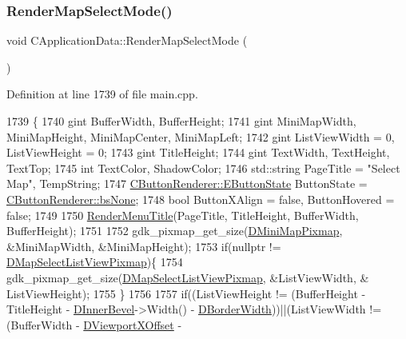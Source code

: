\subsubsection{\texorpdfstring{Render\+Map\+Select\+Mode()}{RenderMapSelectMode()}}
{\footnotesize\ttfamily void C\+Application\+Data\+::\+Render\+Map\+Select\+Mode (\begin{DoxyParamCaption}{ }\end{DoxyParamCaption})\hspace{0.3cm}{\ttfamily [protected]}}



Definition at line 1739 of file main.\+cpp.


\begin{DoxyCode}
1739                                           \{
1740     gint BufferWidth, BufferHeight;
1741     gint MiniMapWidth, MiniMapHeight, MiniMapCenter, MiniMapLeft;
1742     gint ListViewWidth = 0, ListViewHeight = 0;
1743     gint TitleHeight;
1744     gint TextWidth, TextHeight, TextTop;
1745     \textcolor{keywordtype}{int} TextColor, ShadowColor;
1746     std::string PageTitle = \textcolor{stringliteral}{"Select Map"}, TempString;
1747     \hyperlink{classCButtonRenderer_ae0eccda184600f6e14bfd59033e5e9a1}{CButtonRenderer::EButtonState} ButtonState = 
      \hyperlink{classCButtonRenderer_ae0eccda184600f6e14bfd59033e5e9a1aa0cd7277705307bef6c50f2250b5d62d}{CButtonRenderer::bsNone};
1748     \textcolor{keywordtype}{bool} ButtonXAlign = \textcolor{keyword}{false}, ButtonHovered = \textcolor{keyword}{false};
1749     
1750     \hyperlink{classCApplicationData_a548c5924a281c7e226fd7cac44e59920}{RenderMenuTitle}(PageTitle, TitleHeight, BufferWidth, BufferHeight); 
1751 
1752     gdk\_pixmap\_get\_size(\hyperlink{classCApplicationData_abe3af81659ead5113b7b2f165a88e737}{DMiniMapPixmap}, &MiniMapWidth, &MiniMapHeight); 
1753     \textcolor{keywordflow}{if}(\textcolor{keyword}{nullptr} != \hyperlink{classCApplicationData_a76e4af228d69ca3c6b1cf0770ca2e7a0}{DMapSelectListViewPixmap})\{
1754         gdk\_pixmap\_get\_size(\hyperlink{classCApplicationData_a76e4af228d69ca3c6b1cf0770ca2e7a0}{DMapSelectListViewPixmap}, &ListViewWidth, &
      ListViewHeight); 
1755     \}
1756 
1757     \textcolor{keywordflow}{if}((ListViewHeight != (BufferHeight - TitleHeight - \hyperlink{classCApplicationData_a29a687c44dceb9e87a56d96612d59ab5}{DInnerBevel}->Width() - 
      \hyperlink{classCApplicationData_a566b69c72fa982c6ecf8e47dc21df489}{DBorderWidth}))||(ListViewWidth != (BufferWidth - \hyperlink{classCApplicationData_a306bba873ccc47126111305fe21ef3ff}{DViewportXOffset} - 

\end{DoxyCode}
